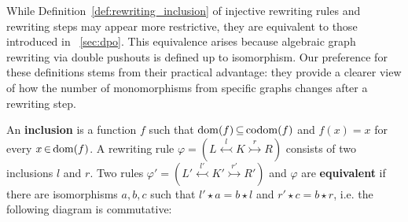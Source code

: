 While Definition~\ref{def:rewriting_inclusion} of injective rewriting rules and rewriting steps may appear more restrictive, they are equivalent to those introduced in \textsection~\ref{sec:dpo}. This equivalence arises because algebraic graph rewriting via double pushouts is defined up to isomorphism. Our preference for these definitions stems from their practical advantage: they provide a clearer view of how the number of monomorphisms from specific graphs changes after a rewriting step. 
 
\begin{definition}
    \label{def:rewriting_inclusion}
    An \textbf{inclusion} is a function $f$ such that $\operatorname{dom}(f) \mathop{\subseteq} \operatorname{codom}(f)$ and $f(x) \mathop{=} x$ for every $x \mathop{\in} \operatorname{dom}(f)$.
    A rewriting rule $\varphi \mathop{=} (L \overset{l}{\leftarrowtail} K \overset{r}{\rightarrowtail} R)$ consists of two inclusions $l$ and $r$.  
    Two rules $\varphi' \mathop{=} (L' \overset{l'}{\leftarrowtail} K' \overset{r'}{\rightarrowtail} R')$ and $\varphi$ are \textbf{equivalent} if there are isomorphisms $a,b,c$ such that 
    $l' \mathop{\star} a \mathop{=} b \mathop{\star} l$ and $r' \mathop{\star} c \mathop{=} b \mathop{\star} r$, i.e. the following diagram is commutative:    
            \begin{center}
\end{center}
\end{definition}
